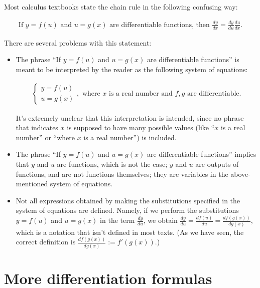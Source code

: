 Most calculus textbooks state the chain rule in the following confusing way:

\begin{align*}
    \text{If $y = f(u)$ and $u = g(x)$ are differentiable functions, then } \frac{dy}{dx} = \frac{dy}{du} \frac{du}{dx}.
\end{align*}

There are several problems with this statement: 

\begin{itemize}
    \item The phrase ``If $y = f(u)$ and $u = g(x)$ are differentiable functions'' is meant to be interpreted by the reader as the following system of equations:

    \begin{align*}
        \begin{cases}
           y = f(u) \\
           u = g(x)
        \end{cases},
        \text{ where $x$ is a real number and $f, g$ are differentiable}.
    \end{align*}

    It's extremely unclear that this interpretation is intended, since no phrase that indicates $x$ is supposed to have many possible values (like ``$x$ is a real number'' or ``where $x$ is a real number'') is included.
    
    \item The phrase ``If $y = f(u)$ and $u = g(x)$ are differentiable functions'' implies that $y$ and $u$ are functions, which is not the case; $y$ and $u$ are outputs of functions, and are not functions themselves; they are variables in the above-mentioned system of equations.

    \item Not all expressions obtained by making the substitutions specified in the system of equations are defined. Namely, if we perform the substitutions $y = f(u)$ and $u = g(x)$ in the term $\frac{dy}{du}$, we obtain $\frac{dy}{du} = \frac{df(u)}{du} = \frac{df(g(x))}{dg(x)}$, which is a notation that isn't defined in most texts. (As we have seen, the correct definition is $\frac{df(g(x))}{dg(x)} := f'(g(x))$.)  
\end{itemize}

\section*{More differentiation formulas}


